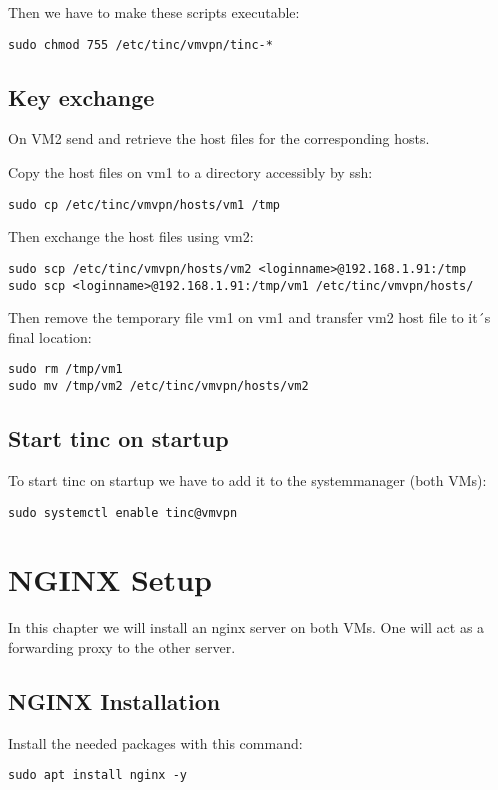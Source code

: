 \documentclass[10pt,a4paper]{article}
\begin{document}
Then we have to make these scripts executable:
\begin{verbatim}
sudo chmod 755 /etc/tinc/vmvpn/tinc-*
\end{verbatim}

\subsection{Key exchange}
On VM2 send and retrieve the host files for the corresponding hosts.

Copy the host files on vm1 to a directory accessibly by ssh:
\begin{verbatim}
sudo cp /etc/tinc/vmvpn/hosts/vm1 /tmp
\end{verbatim}

Then exchange the host files using vm2:
\begin{verbatim}
sudo scp /etc/tinc/vmvpn/hosts/vm2 <loginname>@192.168.1.91:/tmp
sudo scp <loginname>@192.168.1.91:/tmp/vm1 /etc/tinc/vmvpn/hosts/
\end{verbatim}

Then remove the temporary file vm1 on vm1 and transfer vm2 host file to it´s final location:
\begin{verbatim}
sudo rm /tmp/vm1
sudo mv /tmp/vm2 /etc/tinc/vmvpn/hosts/vm2
\end{verbatim}


\subsection{Start tinc on startup}
To start tinc on startup we have to add it to the systemmanager (both VMs):
\begin{verbatim}
sudo systemctl enable tinc@vmvpn
\end{verbatim}

\newpage
\section{NGINX Setup}
In this chapter we will install an nginx server on both VMs. One will act as a forwarding proxy to the other server.

\subsection{NGINX Installation}
Install the needed packages with this command:
\begin{verbatim}
sudo apt install nginx -y
\end{verbatim}
\end{document}
